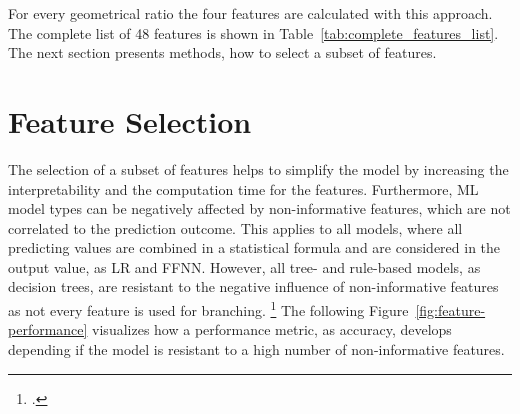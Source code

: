 For every geometrical ratio the four features are calculated with this approach.
The complete list of 48 features is shown in Table~\ref{tab:complete_features_list}. The next section
presents methods, how to select a subset of features.

\section{Feature Selection}
\label{sec:feature_engineering}

The selection of a subset of features helps to simplify the model by increasing the interpretability and the computation time
for the features. Furthermore, \gls{ML} model types can be negatively affected by non-informative features, which are not correlated
to the prediction outcome. This applies to all models, where all predicting values are combined in a statistical formula
and are considered in the output value, as \gls{LR} and \gls{FFNN}. However, all tree- and rule-based models, as decision trees, are resistant
to the negative influence of non-informative features as not every feature is used for branching. \footcite[cf.][pp. 487--489]{kuhn_applied_2016}
The following Figure~\ref{fig:feature-performance} visualizes how a performance metric, as accuracy, develops depending if the model is
resistant to a high number of non-informative features.


